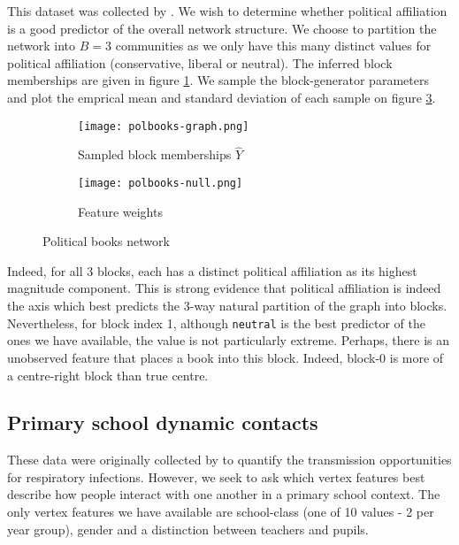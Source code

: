 This dataset was collected by \citet{polbooks}. We wish to determine whether political affiliation is a good predictor of the overall network structure. We choose to partition the network into $B=3$ communities as we only have this many distinct values for political affiliation (conservative, liberal or neutral). The inferred block memberships are given in figure \ref{fig:books-graph}. We sample the block-generator parameters and plot the emprical mean and standard deviation of each sample on figure \ref{fig:book-null}.
%
\begin{figure}[!h]
	\centering
	\begin{subfigure}{0.3\linewidth}
		\centering
		\texttt{[image: polbooks-graph.png]}
		\caption{Sampled block memberships $\hat{Y}$}
		\label{fig:books-graph}
	\end{subfigure}
	\hfill
	\begin{subfigure}{0.5\linewidth}
		\centering
		\texttt{[image: polbooks-null.png]}
		\caption{Feature weights}
		\label{fig:book-null}
	\end{subfigure}
	\caption{Political books network \cite{polbooks}}
\end{figure}
%
Indeed, for all 3 blocks, each has a distinct political affiliation as its highest magnitude component. This is strong evidence that political affiliation is indeed the axis which best predicts the 3-way natural partition of the graph into blocks. Nevertheless, for block index 1, although \verb*|neutral| is the best predictor of the ones we have available, the value is not particularly extreme. Perhaps, there is an unobserved feature that places a book into this block. Indeed, block-0 is more of a centre-right block than true centre.

\FloatBarrier
\subsection{Primary school dynamic contacts}

These data were originally collected by \citet{schools} to quantify the transmission opportunities for respiratory infections. However, we seek to ask which vertex features best describe how people interact with one another in a primary school context. The only vertex features we have available are school-class (one of 10 values - 2 per year group), gender and a distinction between teachers and pupils.

